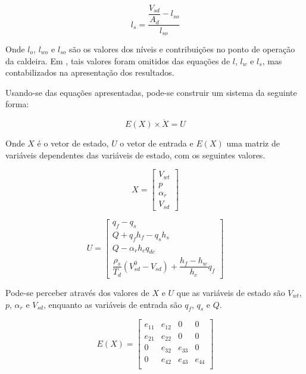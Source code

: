 \begin{equation}
  l_s = \dfrac{\dfrac{V_{sd}}{A_d} - l_{so}}{l_{so}}
  \label{contrib_s_nivel}
\end{equation}

Onde $l_o$, $l_{wo}$ e $l_{so}$ são os valores dos níveis e
contribuições no ponto de operação da caldeira. Em
, tais valores foram omitidos das equações de $l$,
$l_w$ e $l_s$, mas contabilizados na apresentação dos resultados.

Usando-se das equações apresentadas, pode-se construir um sistema
da seguinte forma:

\begin{equation}
  E(X) \times \dot{X} = U
  \label{sistema_geral}
\end{equation}

Onde $X$ é o vetor de estado, $U$ o vetor de entrada e $E(X)$ uma
matriz de variáveis dependentes das variáveis de estado, com os
seguintes valores.

\begin{equation}
  X = \begin{bmatrix}
    V_{wt} \\
    p \\
    \alpha_r \\
    V_{sd}
  \end{bmatrix}
  \label{X_vec}
\end{equation}

\begin{equation}
  U = \begin{bmatrix}
    q_f - q_s \\
    Q + q_fh_f - q_s h_s \\
    Q - \alpha_r h_c q_{dc} \\
    \dfrac{\rho_s}{T_d} (V_{sd}^0 - V_{sd}) + \dfrac{h_f - h_w}{h_c}
    q_f
    \end{bmatrix}
  \label{U_vec}
\end{equation}

Pode-se perceber através dos valores de $X$ e $U$ que as variáveis de
estado são $V_{wt}$, $p$, $\alpha_r$ e $V_{sd}$, enquanto as variáveis
de entrada são $q_f$, $q_s$ e $Q$.

\begin{equation}
  E(X) = \begin{bmatrix}
    e_{11} & e_{12} & 0 & 0 \\
    e_{21} & e_{22} & 0 & 0 \\
    0 & e_{32} & e_{33} & 0 \\
    0 & e_{42} & e_{43} & e_{44} \\
  \end{bmatrix}
  \label{E_x_mat}
\end{equation}

